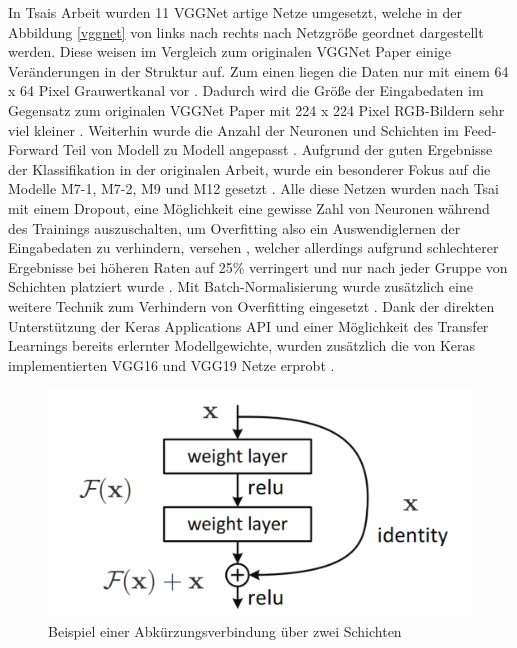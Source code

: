 \documentclass[twoside,a4paper]{IEEEtran}
\begin{document}
In Tsais Arbeit wurden 11 VGGNet artige Netze umgesetzt, welche in der Abbildung \ref{vggnet} von links nach rechts nach Netzgröße geordnet dargestellt werden. Diese weisen im Vergleich zum originalen VGGNet Paper einige Veränderungen in der Struktur auf. Zum einen liegen die Daten nur mit einem 64 x 64 Pixel Grauwertkanal vor \cite[S.3]{RHC}. Dadurch wird die Größe der Eingabedaten im Gegensatz zum originalen VGGNet Paper mit 224 x 224 Pixel RGB-Bildern sehr viel kleiner \cite[S.2]{simonyan2015deep}. Weiterhin wurde die Anzahl der Neuronen und Schichten im Feed-Forward Teil von Modell zu Modell angepasst \cite[S.3]{RHC}. Aufgrund der guten Ergebnisse der Klassifikation in der originalen Arbeit, wurde ein besonderer Fokus auf die Modelle M7-1, M7-2, M9 und M12 gesetzt \cite[S.5]{RHC}. Alle diese Netzen wurden nach Tsai mit einem Dropout, eine Möglichkeit eine gewisse Zahl von Neuronen während des Trainings auszuschalten, um Overfitting also ein Auswendiglernen der Eingabedaten zu verhindern, versehen \cite[S.306-307]{MACHINE_LEARNING}, welcher allerdings aufgrund schlechterer Ergebnisse bei höheren Raten auf 25\% verringert und nur nach jeder Gruppe von Schichten platziert wurde \cite[S.2]{RHC}. Mit Batch-Normalisierung wurde zusätzlich eine weitere Technik zum Verhindern von Overfitting eingesetzt \cite[S.282-283]{MACHINE_LEARNING}. Dank der direkten Unterstützung der Keras Applications API und einer Möglichkeit des Transfer Learnings bereits erlernter Modellgewichte, wurden zusätzlich die von Keras implementierten VGG16 und VGG19 Netze erprobt \cite{vgg_keras}.

\begin{figure}[!htb]
	\includegraphics[width=\columnwidth]{residual}
	\caption{Beispiel einer Abkürzungsverbindung über zwei Schichten \cite[S.2]{resnet}}
	\label{res}
\end{figure}
\end{document}
